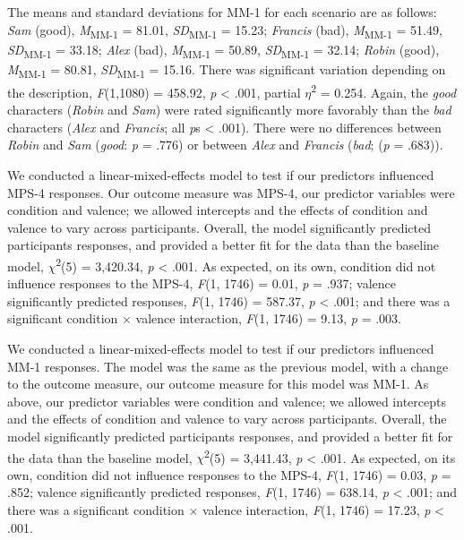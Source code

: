 \documentclass[
  english,
  man,floatsintext]{apa7}
\begin{document}
The means and standard deviations for MM-1 for each scenario are as follows:
\emph{Sam} (good),
\emph{M}\textsubscript{MM-1} = 81.01, \emph{SD}\textsubscript{MM-1} = 15.23;
\emph{Francis} (bad),
\emph{M}\textsubscript{MM-1} = 51.49, \emph{SD}\textsubscript{MM-1} = 33.18;
\emph{Alex} (bad),
\emph{M}\textsubscript{MM-1} = 50.89, \emph{SD}\textsubscript{MM-1} = 32.14;
\emph{Robin} (good),
\emph{M}\textsubscript{MM-1} = 80.81, \emph{SD}\textsubscript{MM-1} = 15.16. There was significant variation depending on the description, \emph{F}(1,1080) = 458.92, \emph{p} \textless{} .001, partial \(\eta\)\textsuperscript{2} = 0.254. Again, the \emph{good} characters (\emph{Robin} and \emph{Sam}) were rated significantly more favorably than the \emph{bad} characters (\emph{Alex} and \emph{Francis}; all \emph{p}s \textless{} .001). There were no differences between \emph{Robin} and \emph{Sam} (\emph{good}: \emph{p} = .776) or between \emph{Alex} and \emph{Francis} (\emph{bad}; (\emph{p} = .683)).

We conducted a linear-mixed-effects model to test if our predictors influenced MPS-4 responses. Our outcome measure was MPS-4, our predictor variables were condition and valence; we allowed intercepts and the effects of condition and valence to vary across participants.
Overall, the model significantly predicted participants responses, and provided a better fit for the data than the baseline model,
\(\chi\)\textsuperscript{2}(5) = 3,420.34, \emph{p} \textless{} .001.
As expected, on its own, condition did not influence responses to the MPS-4,
\emph{F}(1, 1746) = 0.01, \emph{p} = .937;
valence significantly predicted responses,
\emph{F}(1, 1746) = 587.37, \emph{p} \textless{} .001;
and there was a significant condition \(\times\) valence interaction,
\emph{F}(1, 1746) = 9.13, \emph{p} = .003.

We conducted a linear-mixed-effects model to test if our predictors influenced MM-1 responses. The model was the same as the previous model, with a change to the outcome measure, our outcome measure for this model was MM-1. As above, our predictor variables were condition and valence; we allowed intercepts and the effects of condition and valence to vary across participants.
Overall, the model significantly predicted participants responses, and provided a better fit for the data than the baseline model,
\(\chi\)\textsuperscript{2}(5) = 3,441.43, \emph{p} \textless{} .001.
As expected, on its own, condition did not influence responses to the MPS-4,
\emph{F}(1, 1746) = 0.03, \emph{p} = .852;
valence significantly predicted responses,
\emph{F}(1, 1746) = 638.14, \emph{p} \textless{} .001;
and there was a significant condition \(\times\) valence interaction,
\emph{F}(1, 1746) = 17.23, \emph{p} \textless{} .001.
\end{document}
